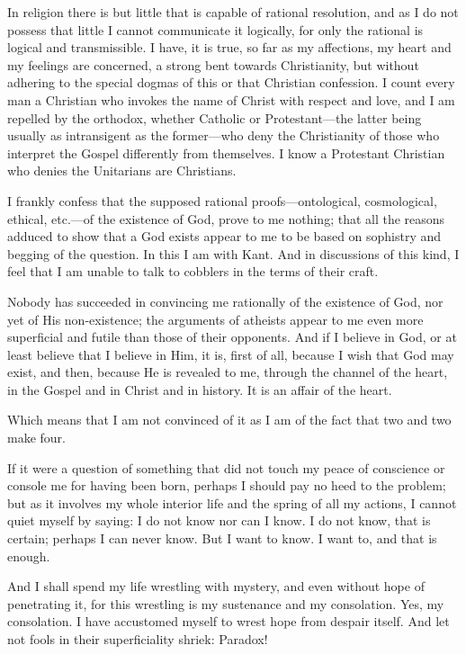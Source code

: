 In religion there is but little that is capable of rational
resolution, and as I do not possess that little I cannot communicate
it logically, for only the rational is logical and transmissible. I
have, it is true, so far as my affections, my heart and my feelings
are concerned, a strong bent towards Christianity, but without
adhering to the special dogmas of this or that Christian confession. I
count every man a Christian who invokes the name of Christ with
respect and love, and I am repelled by the orthodox, whether Catholic
or Protestant---the latter being usually as intransigent as the
former---who deny the Christianity of those who interpret the Gospel
differently from themselves. I know a Protestant Christian who denies
the Unitarians are Christians.

I frankly confess that the supposed rational proofs---ontological,
cosmological, ethical, etc.---of the existence of God, prove to me
nothing; that all the reasons adduced to show that a God exists appear
to me to be based on sophistry and begging of the question. In this I
am with Kant. And in discussions of this kind, I feel that I am unable
to talk to cobblers in the terms of their craft.

Nobody has succeeded in convincing me rationally of the existence of
God, nor yet of His non-existence; the arguments of atheists appear to
me even more superficial and futile than those of their opponents. And
if I believe in God, or at least believe that I believe in Him, it is,
first of all, because I wish that God may exist, and then, because He
is revealed to me,  through the channel of the heart, in the
Gospel and in Christ and in history. It is an affair of the heart.

Which means that I am not convinced of it as I am of the fact that two
and two make four.

If it were a question of something that did not touch my peace of
conscience or console me for having been born, perhaps I should pay no
heed to the problem; but as it involves my whole interior life and the
spring of all my actions, I cannot quiet myself by saying: I do not
know nor can I know. I do not know, that is certain; perhaps I can
never know. But I want to know. I want to, and that is enough.

And I shall spend my life wrestling with mystery, and even without
hope of penetrating it, for this wrestling is my sustenance and my
consolation. Yes, my consolation. I have accustomed myself to wrest
hope from despair itself. And let not fools in their superficiality
shriek: Paradox!

